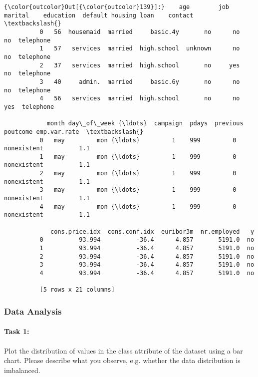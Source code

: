 \documentclass[11pt]{article}
\begin{document}
\begin{Verbatim}[commandchars=\\\{\}]
{\color{outcolor}Out[{\color{outcolor}139}]:}    age        job  marital    education  default housing loan    contact  \textbackslash{}
          0   56  housemaid  married     basic.4y       no      no   no  telephone   
          1   57   services  married  high.school  unknown      no   no  telephone   
          2   37   services  married  high.school       no     yes   no  telephone   
          3   40     admin.  married     basic.6y       no      no   no  telephone   
          4   56   services  married  high.school       no      no  yes  telephone   
          
            month day\_of\_week {\ldots}  campaign  pdays  previous     poutcome emp.var.rate  \textbackslash{}
          0   may         mon {\ldots}         1    999         0  nonexistent          1.1   
          1   may         mon {\ldots}         1    999         0  nonexistent          1.1   
          2   may         mon {\ldots}         1    999         0  nonexistent          1.1   
          3   may         mon {\ldots}         1    999         0  nonexistent          1.1   
          4   may         mon {\ldots}         1    999         0  nonexistent          1.1   
          
             cons.price.idx  cons.conf.idx  euribor3m  nr.employed   y  
          0          93.994          -36.4      4.857       5191.0  no  
          1          93.994          -36.4      4.857       5191.0  no  
          2          93.994          -36.4      4.857       5191.0  no  
          3          93.994          -36.4      4.857       5191.0  no  
          4          93.994          -36.4      4.857       5191.0  no  
          
          [5 rows x 21 columns]
\end{Verbatim}
            
    \subsubsection*{Data Analysis}\label{data-analysis}

    \paragraph{\texorpdfstring{\textbf{Task 1}:}{Task 1:}}\label{task-1}

Plot the distribution of values in the class attribute of the dataset
using a bar chart. Please describe what you observe, e.g. whether the
data distribution is imbalanced.
\end{document}
